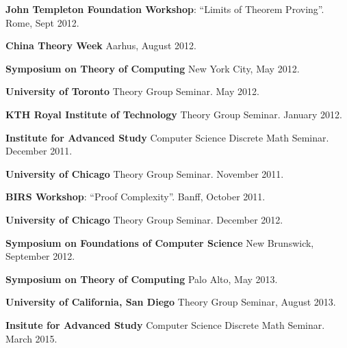 \documentclass[margin,line]{resume}
\begin{document}
\begin{resume}
    \begin{list2}
	\item {\bf John Templeton Foundation Workshop}: ``Limits of Theorem Proving''. Rome, Sept 2012.
	\item {\bf China Theory Week} Aarhus, August 2012.
	\item {\bf Symposium on Theory of Computing} New York City, May 2012.
	\item {\bf University of Toronto} Theory Group Seminar. May 2012.
	\item {\bf KTH Royal Institute of Technology} Theory Group Seminar. January 2012.
	\item {\bf Institute for Advanced Study} Computer Science Discrete Math Seminar. December 2011.
	\item {\bf University of Chicago} Theory Group Seminar. November 2011.
	\item {\bf BIRS Workshop}: ``Proof Complexity''. Banff, October 2011.
	\item {\bf University of Chicago} Theory Group Seminar. December 2012.
	\item {\bf Symposium on Foundations of Computer Science} New Brunswick, September 2012.
	\item {\bf Symposium on Theory of Computing} Palo Alto, May 2013.
	\item {\bf University of California, San Diego} Theory Group Seminar, August 2013.
    \item {\bf Insitute for Advanced Study} Computer Science Discrete Math Seminar. March 2015.
    \end{list2}







\end{resume}
\end{document}
